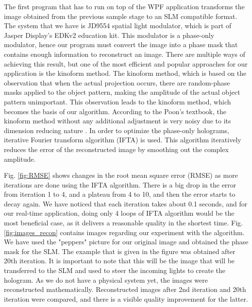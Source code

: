 \documentclass[12pt]{article}
\begin{document}
The first program that has to run on top of the WPF application transforms the image obtained from the previous sample stage to an SLM compatible format. The system that we have is JD9554 spatial light modulator, which is part of Jasper Display's EDKv2 education kit. This modulator is a phase-only modulator, hence our program must convert the image into a phase mask that contains enough information to reconstruct an image. There are multiple ways of achieving this result, but one of the most efficient and popular approaches for our application is the kinoform method. The kinoform method, which is based on the observation that when the actual projection occurs, there are random-phase masks applied to the object pattern, making the amplitude of the actual object pattern unimportant. This observation leads to the kinoform method, which becomes the basis of our algorithm. According to the Poon's textbook, the kinoform method without any additional adjustment is very noisy due to its dimension reducing nature \cite{Poon14}. In order to optimize the phase-only holograms, iterative Fourier transform algorithm (IFTA) is used. This algorithm iteratively reduces the error of the reconstructed image by smoothing out the complex amplitude.

Fig. \ref{fig:RMSE} shows changes in the root mean square error (RMSE) as more iterations are done using the IFTA algorithm. There is a big drop in the error from iteration 1 to 4, and a plateau from 4 to 10, and then the error starts to decay again. We have noticed that each iteration takes about 0.1 seconds, and for our real-time application, doing only 4 loops of IFTA algorithm would be the most beneficial case, as it delivers a reasonable quality in the shortest time. Fig. \ref{fig:images_recon} contains images regarding our experiment with the algorithm. We have used the "peppers" picture for our original image and obtained the phase mask for the SLM. The example that is given in the figure was obtained after 20th iteration. It is important to note that this will be the image that will be transferred to the SLM and used to steer the incoming lights to create the hologram. As we do not have a physical system yet, the images were reconstructed mathematically. Reconstructed images after 2nd iteration and 20th iteration were compared, and there is a visible quality improvement for the latter.
\end{document}
